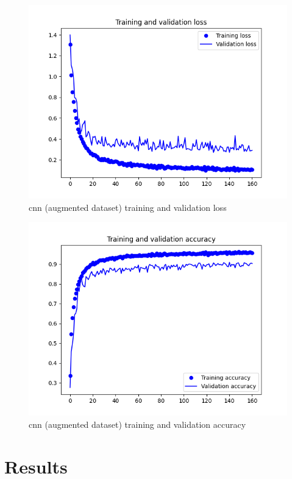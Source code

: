 \documentclass[10pt,twocolumn,letterpaper]{article}
\begin{document}
\begin{figure}[H]
  \centering
   \includegraphics[width=0.9\linewidth, trim={3em, 2em, 4em, 4em}, clip]{cnn_aug_loss}
   \caption{\acrshort{cnn} (augmented dataset) training and validation loss}
   \label{fig:cnn_aug_loss}
\end{figure}

\begin{figure}[H]
  \centering
   \includegraphics[width=0.9\linewidth, trim={3em, 2em, 4em, 4em}, clip]{cnn_aug_accuracy}
   \caption{\acrshort{cnn} (augmented dataset) training and validation accuracy}
   \label{fig:cnn_aug_accuracy}
\end{figure}

\section{Results}
\label{sec:results}
\end{document}
